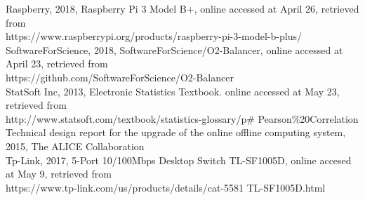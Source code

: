 Raspberry, 2018, Raspberry Pi 3 Model B+, online accessed at April 26, retrieved from \\https://www.raspberrypi.org/products/raspberry-pi-3-model-b-plus/\\

SoftwareForScience, 2018, SoftwareForScience/O2-Balancer, online accessed at April 23, retrieved from \\https://github.com/SoftwareForScience/O2-Balancer\\

StatSoft Inc, 2013, Electronic Statistics Textbook. online accessed at May 23, retrieved from  \\http://www.statsoft.com/textbook/statistics-glossary/p\# Pearson\%20Correlation\\


Technical design report for the upgrade of the online offline computing system, 2015, The ALICE Collaboration\\

Tp-Link, 2017, 5-Port 10/100Mbps Desktop Switch TL-SF1005D, online accesed at May 9, retrieved from \\https://www.tp-link.com/us/products/details/cat-5581 TL-SF1005D.html\\
